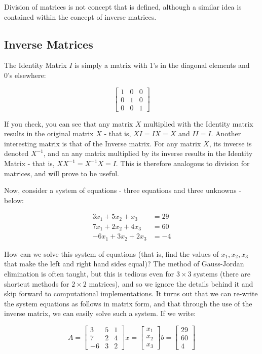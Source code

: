 \documentclass[]{book}
\theoremstyle{definition}
\theoremstyle{definition}
\theoremstyle{definition}
\theoremstyle{remark}
\begin{document}
Division of matrices is not concept that is defined, although a similar
idea is contained within the concept of inverse matrices.

\subsection*{Inverse Matrices}\label{inverse-matrices}

The Identity Matrix \(I\) is simply a matrix with 1's in the diagonal
elements and 0's elsewhere:

\[
\begin{bmatrix} 1 & 0 & 0 \\ 0 & 1 & 0 \\ 0 & 0 & 1 \end{bmatrix}
\]

If you check, you can see that any matrix \(X\) multiplied with the
Identity matrix results in the original matrix \(X\) - that is,
\(XI = IX = X\) and \(II = I\). Another interesting matrix is that of
the Inverse matrix. For any matrix \(X\), its inverse is denoted
\(X^{-1}\), and an any matrix multiplied by its inverse results in the
Identity Matrix - that is, \(XX^{-1} = X^{-1}X = I\). This is therefore
analogous to division for matrices, and will prove to be useful.

Now, consider a system of equations - three equations and three unknowns
- below:

\begin{align*} 
3x_1 + 5x_2 + x_3 &= 29 \\ 
7x_1 + 2x_2 + 4x_3 &= 60 \\ 
-6x_1 + 3x_2 + 2x_3 &= -4 
\end{align*}

How can we solve this system of equations (that is, find the values of
\(x_1, x_2, x_3\) that make the left and right hand sides equal)? The
method of Gauss-Jordan elimination is often taught, but this is tedious
even for \(3 \times 3\) systems (there are shortcut methods for
\(2 \times 2\) matrices), and so we ignore the details behind it and
skip forward to computational implementations. It turns out that we can
re-write the system equations as follows in matrix form, and that
through the use of the inverse matrix, we can easily solve such a
system. If we write:

\[
A = \begin{bmatrix} 3 & 5 & 1 \\ 7 & 2 & 4 \\ -6 & 3 & 2\end{bmatrix}  
x = \begin{bmatrix} x_1  \\ x_2 \\ x_3 \end{bmatrix} 
b = \begin{bmatrix} 29 \\ 60 \\ 4 \end{bmatrix}
\]
\end{document}
